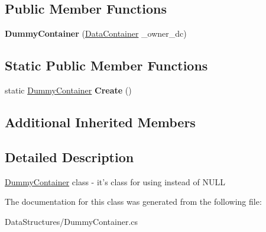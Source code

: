 \subsection*{Public Member Functions}
\begin{DoxyCompactItemize}
\item 
\hypertarget{class_dwarf_d_b_1_1_data_structures_1_1_dummy_container_a62d4c4fe42f254e8c3072bbc4bea6fa2}{{\bfseries Dummy\+Container} (\hyperlink{class_dwarf_d_b_1_1_data_structures_1_1_data_container}{Data\+Container} \+\_\+owner\+\_\+dc)}\label{class_dwarf_d_b_1_1_data_structures_1_1_dummy_container_a62d4c4fe42f254e8c3072bbc4bea6fa2}

\end{DoxyCompactItemize}
\subsection*{Static Public Member Functions}
\begin{DoxyCompactItemize}
\item 
\hypertarget{class_dwarf_d_b_1_1_data_structures_1_1_dummy_container_a020db8f3d0bd48af1bcfba5d07e6e058}{static \hyperlink{class_dwarf_d_b_1_1_data_structures_1_1_dummy_container}{Dummy\+Container} {\bfseries Create} ()}\label{class_dwarf_d_b_1_1_data_structures_1_1_dummy_container_a020db8f3d0bd48af1bcfba5d07e6e058}

\end{DoxyCompactItemize}
\subsection*{Additional Inherited Members}


\subsection{Detailed Description}
\hyperlink{class_dwarf_d_b_1_1_data_structures_1_1_dummy_container}{Dummy\+Container} class -\/ it's class for using instead of N\+U\+L\+L 



The documentation for this class was generated from the following file\+:\begin{DoxyCompactItemize}
\item 
Data\+Structures/Dummy\+Container.\+cs\end{DoxyCompactItemize}
